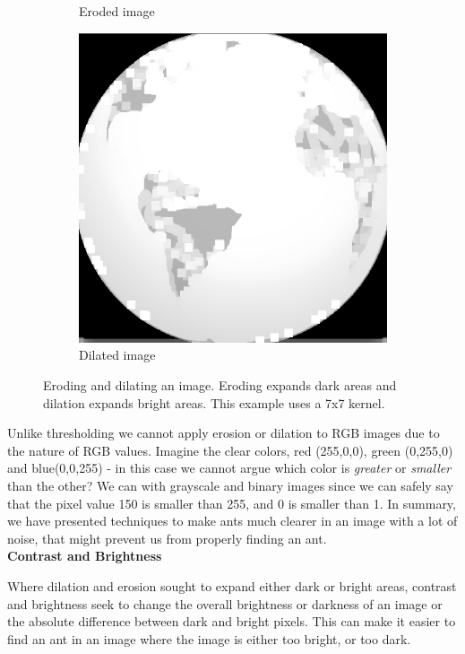 \begin{figure}[!ht]
\begin{subfigure}[b]{0.3\textwidth}
                \caption{Eroded image}
        \end{subfigure}
		\quad
        \begin{subfigure}[b]{0.3\textwidth}
                \includegraphics[scale = 0.2]{img/dilate}
                \caption{Dilated image}
        \end{subfigure}
		\caption{Eroding and dilating an image. Eroding expands dark areas and dilation expands bright areas. This example uses a 7x7 kernel.}
		\label{fig:erodedilate}
\end{figure}

Unlike thresholding we cannot apply erosion or dilation to RGB images due to the nature of RGB values. Imagine the clear colors, red (255,0,0), green (0,255,0) and blue(0,0,255) - in this case we cannot argue which color is \textit{greater} or \textit{smaller} than the other? We can with grayscale and binary images since we can safely say that the pixel value 150 is smaller than 255, and 0 is smaller than 1. In summary, we have presented techniques to make ants much clearer in an image with a lot of noise, that might prevent us from properly finding an ant.\\

\noindent \textbf{Contrast and Brightness} \par
Where dilation and erosion sought to expand either dark or bright areas, contrast and brightness seek to change the overall brightness or darkness of an image or the absolute difference between dark and bright pixels. This can make it easier to find an ant in an image where the image is either too bright, or too dark.\\


